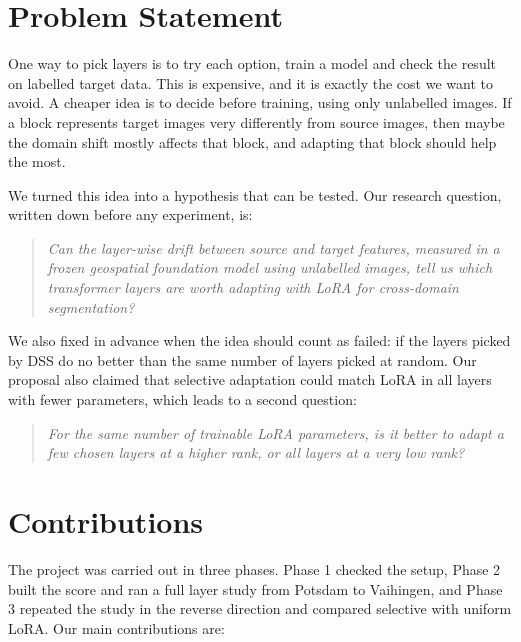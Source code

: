 \documentclass[11pt,a4paper]{report}
\begin{document}
\section{Problem Statement}

One way to pick layers is to try each option, train a model and check the result on labelled target data. This is expensive, and it is exactly the cost we want to avoid. A cheaper idea is to decide before training, using only unlabelled images. If a block represents target images very differently from source images, then maybe the domain shift mostly affects that block, and adapting that block should help the most.

We turned this idea into a hypothesis that can be tested. Our research question, written down before any experiment, is:

\begin{quote}
\textit{Can the layer-wise drift between source and target features, measured in a frozen geospatial foundation model using unlabelled images, tell us which transformer layers are worth adapting with LoRA for cross-domain segmentation?}
\end{quote}

We also fixed in advance when the idea should count as failed: if the layers picked by DSS do no better than the same number of layers picked at random. Our proposal also claimed that selective adaptation could match LoRA in all layers with fewer parameters, which leads to a second question:

\begin{quote}
\textit{For the same number of trainable LoRA parameters, is it better to adapt a few chosen layers at a higher rank, or all layers at a very low rank?}
\end{quote}

\section{Contributions}

The project was carried out in three phases. Phase 1 checked the setup, Phase 2 built the score and ran a full layer study from Potsdam to Vaihingen, and Phase 3 repeated the study in the reverse direction and compared selective with uniform LoRA. Our main contributions are:
\end{document}
